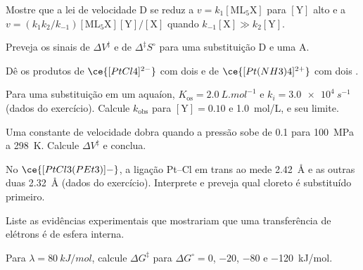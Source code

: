 \begin{exercise}[$\star$]\label{exo:b3:complex-mechanisms:2}
Mostre que a lei de velocidade D se reduz a $v = k_1[\mathrm{ML_5X}]$ para $[\mathrm Y]$ alto e a $v = (k_1k_2/k_{-1})
[\mathrm{ML_5X}][\mathrm Y]/[\mathrm X]$ quando $k_{-1}[\mathrm X] \gg k_2[\mathrm Y]$.
\end{exercise}

\begin{exercise}[$\star$]\label{exo:b3:complex-mechanisms:3}
Preveja os sinais de $\Delta V^{\ddagger}$ e de $\Delta^{\ddagger}S^\circ$ para uma substituição D e uma A.
\end{exercise}

\begin{exercise}[$\star$]\label{exo:b3:complex-mechanisms:4}
Dê os produtos de $\ce{[PtCl4]^{2-}}$ com dois  e de $\ce{[Pt(NH3)4]^{2+}}$ com dois .
\end{exercise}

\begin{exercise}[$\star\star$]\label{exo:b3:complex-mechanisms:5}
Para uma substituição em um aquaíon, $K_{\mathrm{os}} = \qty{2.0}{L.mol^{-1}}$ e $k_i = \qty{3.0e4}{s^{-1}}$ (dados do
exercício). Calcule $k_{\mathrm{obs}}$ para $[\mathrm Y] = 0.10$ e \qty{1.0}{mol/L}, e seu limite.
\end{exercise}

\begin{exercise}[$\star\star$]\label{exo:b3:complex-mechanisms:6}
Uma constante de velocidade dobra quando a pressão sobe de 0.1 para \qty{100}{MPa} a \qty{298}{K}.
Calcule $\Delta V^{\ddagger}$ e conclua.
\end{exercise}

\begin{exercise}[$\star\star$]\label{exo:b3:complex-mechanisms:7}
No $\ce{[PtCl3(PEt3)]-}$, a ligação Pt--Cl em trans ao  mede \qty{2.42}{\angstrom} e as outras duas \qty{2.32}{\angstrom}
(dados do exercício). Interprete e preveja qual cloreto é substituído primeiro.
\end{exercise}

\begin{exercise}[$\star\star$]\label{exo:b3:complex-mechanisms:8}
Liste as evidências experimentais que mostrariam que uma transferência de elétrons é de
esfera interna.
\end{exercise}

\begin{exercise}[$\star\star$]\label{exo:b3:complex-mechanisms:9}
Para $\lambda = \qty{80}{kJ/mol}$, calcule $\Delta G^{\ddagger}$ para $\Delta G^\circ = 0$, $-20$, $-80$ e \qty{-120}{kJ/mol}.
\end{exercise}

